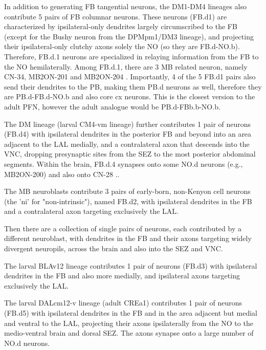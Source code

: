             In addition to generating FB tangential neurons, the DM1-DM4 lineages also contribute 5 pairs of FB columnar neurons. These neurons (FB.d1) are characterized by ipsilateral-only dendrites largely circumscribed to the FB (except for the Bushy neuron from the DPMpm1/DM3 lineage), and projecting their ipsilateral-only clutchy axons solely the NO (so they are FB.d-NO.b). Therefore, FB.d.1 neurons are specialized in relaying information from the FB to the NO hemilaterally. Among FB.d.1, there are 3 MB related neuron, namely CN-34, MB2ON-201 and MB2ON-204  \citep{eschbach2021circuits}. Importantly, 4 of the 5 FB.d1 pairs also send their dendrites to the PB, making them PB.d neurons as well, therefore they are PB.d-FB.d-NO.b and also core cx neurons. This is the closest version to the adult PFN, however the adult analogue would be PB.d-FBb.b-NO.b. %

            The DM lineage (larval CM4-vm lineage) further contributes 1 pair of neurons (FB.d4) with ipsilateral dendrites in the posterior FB and beyond into an area adjacent to the LAL medially, and a contralateral axon that descends into the VNC, dropping presynaptic sites from the SEZ to the most posterior abdominal segments. Within the brain, FB.d.4 synapses onto some NO.d neurons (e.g., MB2ON-200) and also onto CN-28 \citep{eschbach2021circuits}..

            The MB neuroblasts contribute 3 pairs of early-born, non-Kenyon cell neurons (the 'ni' for "non-intrinsic"), named FB.d2, with ipsilateral dendrites in the FB and a contralateral axon targeting exclusively the LAL.

            Then there are a collection of single pairs of neurons, each contributed by a different neuroblast, with dendrites in the FB and their axons targeting widely divergent neuropils, across the brain and also into the SEZ and VNC.

            The larval BLAv12 lineage contributes 1 pair of neurons (FB.d3) with ipsilateral dendrites in the FB and also more medially, and ipsilateral axons targeting exclusively the LAL.

            The larval DALcm12-v lineage (adult CREa1) contributes 1 pair of neurons (FB.d5) with ipsilateral dendrites in the FB and in the area adjacent but medial and ventral to the LAL, projecting their axons ipsilaterally from the NO to the medio-ventral brain and dorsal SEZ. The axons synapse onto a large number of NO.d neurons.

